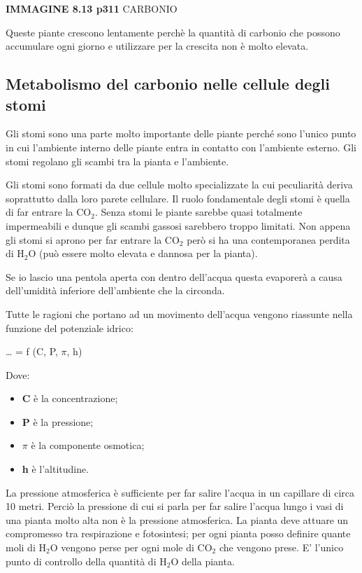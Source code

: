 \documentclass[]{article}
\begin{document}
\textbf{IMMAGINE 8.13 p311} CARBONIO

Queste piante crescono lentamente perchè la quantità di carbonio che
possono accumulare ogni giorno e utilizzare per la crescita non è molto
elevata.

\subsection{Metabolismo del carbonio nelle cellule degli
stomi}\label{metabolismo-del-carbonio-nelle-cellule-degli-stomi}

Gli stomi sono una parte molto importante delle piante perché sono
l'unico punto in cui l'ambiente interno delle piante entra in contatto
con l'ambiente esterno. Gli stomi regolano gli scambi tra la pianta e
l'ambiente.

Gli stomi sono formati da due cellule molto specializzate la cui
peculiarità deriva soprattutto dalla loro parete cellulare. Il ruolo
fondamentale degli stomi è quella di far entrare la CO$_2$. Senza stomi
le piante sarebbe quasi totalmente impermeabili e dunque gli scambi
gassosi sarebbero troppo limitati. Non appena gli stomi si aprono per
far entrare la CO$_2$ però si ha una contemporanea perdita di H$_2$O
(può essere molto elevata e dannosa per la pianta).

Se io lascio una pentola aperta con dentro dell'acqua questa evaporerà a
causa dell'umidità inferiore dell'ambiente che la circonda.

Tutte le ragioni che portano ad un movimento dell'acqua vengono
riassunte nella funzione del potenziale idrico:

\ldots{} = f (C, P, $\pi$, h)

Dove:

\begin{itemize}
\itemsep1pt\parskip0pt
\item
  \textbf{C} è la concentrazione;
\item
  \textbf{P} è la pressione;
\item
  \textbf{$\pi$} è la componente osmotica;
\item
  \textbf{h} è l'altitudine.
\end{itemize}

La pressione atmosferica è sufficiente per far salire l'acqua in un
capillare di circa 10 metri. Perciò la pressione di cui si parla per far
salire l'acqua lungo i vasi di una pianta molto alta non è la pressione
atmosferica. La pianta deve attuare un compromesso tra respirazione e
fotosintesi; per ogni pianta posso definire quante moli di H$_2$O
vengono perse per ogni mole di CO$_2$ che vengono prese. E' l'unico
punto di controllo della quantità di H$_2$O della pianta.
\end{document}
